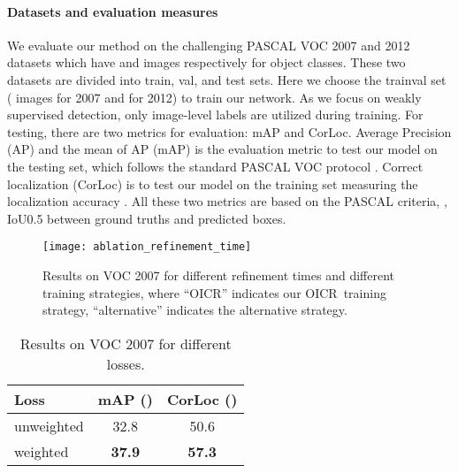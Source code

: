 \documentclass[10pt,twocolumn,letterpaper]{article}
\def\methodname{OICR}
\begin{document}
\paragraph{Datasets and evaluation measures}
We evaluate our method on the challenging PASCAL VOC 2007 and 2012 datasets \cite{Ref:Everingham2010} which have  and  images respectively for  object classes.
These two datasets are divided into train, val, and test sets.
Here we choose the trainval set ( images for 2007 and  for 2012) to train our network.
As we focus on weakly supervised detection, only image-level labels are utilized during training.
For testing, there are two metrics for evaluation: mAP and CorLoc.
Average Precision (AP) and the mean of AP (mAP) is the evaluation metric to test our model on the testing set, which follows the standard PASCAL VOC protocol \cite{Ref:Everingham2010}.
Correct localization (CorLoc) is to test our model on the training set measuring the localization accuracy \cite{Ref:Deselaers2012}.
All these two metrics are based on the PASCAL criteria, \ie, IoU0.5 between ground truths and predicted boxes.


\begin{figure}[t]
\begin{center}
   \texttt{[image: ablation\_refinement\_time]}
\end{center}
   \caption{Results on VOC 2007 for different refinement times and different training strategies, where ``\methodname'' indicates our \methodname\ training strategy, ``alternative'' indicates the alternative strategy.}
\label{fig:ablation_refinement_time}
\end{figure}

\begin{table}[t]
\begin{center}
\footnotesize
\begin{tabular}{|l|c|c|}
   \hline
   Loss & mAP () & CorLoc () \\
   \hline\hline
   unweighted & 32.8 & 50.6 \\
   weighted & \bf{37.9} & \bf{57.3} \\
   \hline
\end{tabular}
\end{center}
\caption{Results on VOC 2007 for different losses.}
\label{table:weight}
\end{table}
\end{document}
